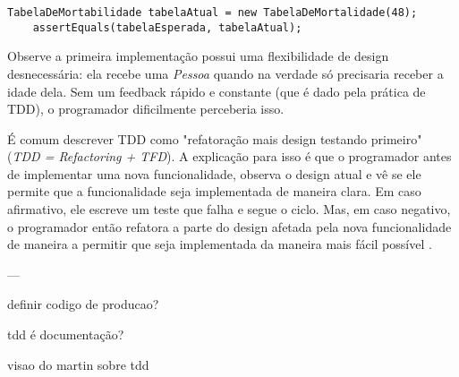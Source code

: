 \begin{lstlisting}[frame=trbl]
	TabelaDeMortabilidade tabelaAtual = new TabelaDeMortalidade(48);
	assertEquals(tabelaEsperada, tabelaAtual);
\end{lstlisting}

Observe a primeira implementação possui uma flexibilidade de design desnecessária: ela recebe uma \textit{Pessoa} quando na verdade só
precisaria receber a idade dela. Sem um feedback rápido e constante (que é dado pela prática de TDD), o programador dificilmente
perceberia isso.

É comum descrever TDD como "refatoração mais design testando primeiro" (\textit{TDD = Refactoring + TFD}). A explicação para isso é que o programador
antes de implementar uma nova funcionalidade, observa o design atual e vê se ele permite que a funcionalidade seja implementada de maneira clara.
Em caso afirmativo, ele escreve um teste que falha e segue o ciclo. Mas, em caso negativo, o programador então refatora a parte do design afetada
pela nova funcionalidade de maneira a permitir que seja implementada da maneira mais fácil possível \cite{wambler-tdd}.

---


definir codigo de producao?


tdd é documentação?

visao do martin sobre tdd


